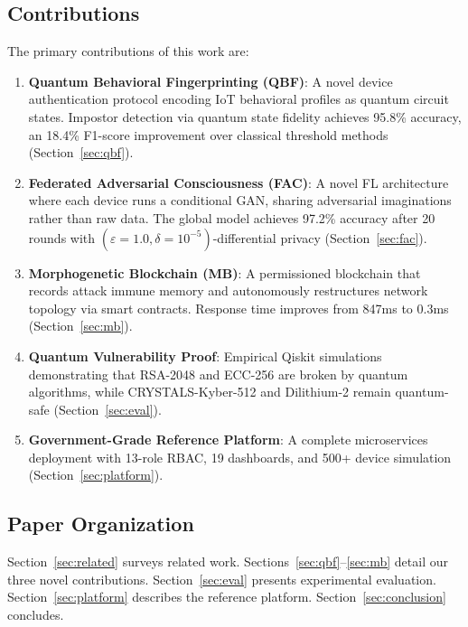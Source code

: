 \subsection{Contributions}

The primary contributions of this work are:

\begin{enumerate}
  \item \textbf{Quantum Behavioral Fingerprinting (QBF)}: A novel device authentication
        protocol encoding IoT behavioral profiles as quantum circuit states.
        Impostor detection via quantum state fidelity achieves 95.8\% accuracy,
        an 18.4\% F1-score improvement over classical threshold methods (Section~\ref{sec:qbf}).

  \item \textbf{Federated Adversarial Consciousness (FAC)}: A novel FL architecture
        where each device runs a conditional GAN, sharing adversarial imaginations
        rather than raw data. The global model achieves 97.2\% accuracy after 20
        rounds with $(\varepsilon=1.0, \delta=10^{-5})$-differential privacy
        (Section~\ref{sec:fac}).

  \item \textbf{Morphogenetic Blockchain (MB)}: A permissioned blockchain that
        records attack immune memory and autonomously restructures network topology
        via smart contracts. Response time improves from 847ms to 0.3ms
        (Section~\ref{sec:mb}).

  \item \textbf{Quantum Vulnerability Proof}: Empirical Qiskit simulations
        demonstrating that RSA-2048 and ECC-256 are broken by quantum algorithms,
        while CRYSTALS-Kyber-512 and Dilithium-2 remain quantum-safe
        (Section~\ref{sec:eval}).

  \item \textbf{Government-Grade Reference Platform}: A complete microservices
        deployment with 13-role RBAC, 19 dashboards, and 500+ device simulation
        (Section~\ref{sec:platform}).
\end{enumerate}

\subsection{Paper Organization}

Section~\ref{sec:related} surveys related work. Sections~\ref{sec:qbf}--\ref{sec:mb}
detail our three novel contributions. Section~\ref{sec:eval} presents experimental
evaluation. Section~\ref{sec:platform} describes the reference platform.
Section~\ref{sec:conclusion} concludes.
